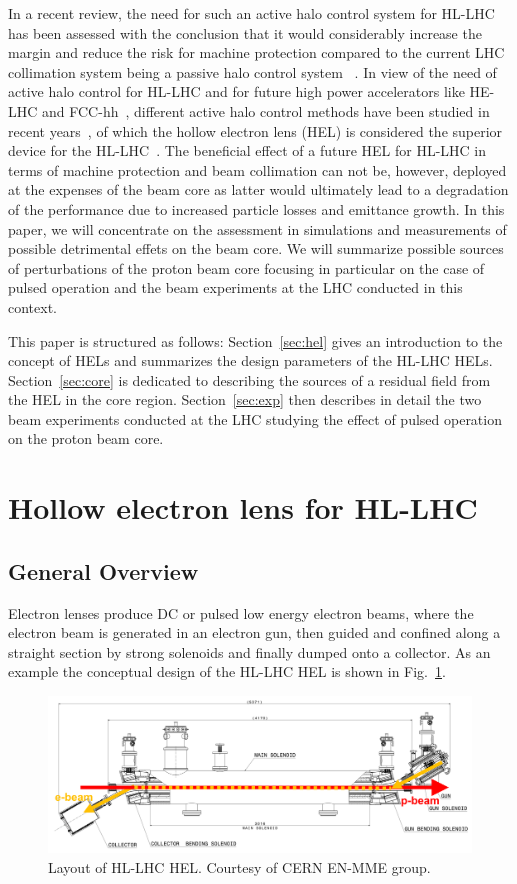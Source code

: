\documentclass[%
 reprint,
 amsmath,amssymb,
 aps,
prstab,
]{revtex4-1}
\begin{document}
In a recent review, the need for such an active halo control system for HL-LHC has been assessed with the conclusion that it would considerably increase the margin and reduce the risk for machine protection compared to the current LHC collimation system being a passive halo control system ~\cite{helreview}. In view of the need of active halo control for HL-LHC and for future high power accelerators like HE-LHC and FCC-hh~\cite{helhcparam2011,fcc_coll_ipac2017}, different active halo control methods have been studied in recent years~\cite{helreview_bruce}, of which the hollow electron lens (HEL) is considered the superior device for the HL-LHC~\cite{helreview}. The beneficial effect of a future HEL for HL-LHC in terms of machine protection and beam collimation can not be, however, deployed at the expenses of the beam core as latter would ultimately lead to a degradation of the performance due to increased particle losses and emittance growth. In this paper, we will concentrate on the assessment in simulations and measurements of possible detrimental effets on the beam core. We will summarize possible sources of perturbations of the proton beam core focusing in particular on the case of pulsed operation and the beam experiments at the LHC conducted in this context.

This paper is structured as follows: Section~\ref{sec:hel} gives an introduction to the concept of HELs and summarizes the design parameters of the HL-LHC HELs. Section~\ref{sec:core} is dedicated to describing the sources of a residual field from the HEL in the core region. Section~\ref{sec:exp} then describes in detail the two beam experiments conducted at the LHC studying the effect of pulsed operation on the proton beam core.

\section{Hollow electron lens for HL-LHC\label{sec:hel}}
\subsection{General Overview\label{sec:hel:intro}}
Electron lenses produce DC or pulsed low energy electron beams, where the electron beam is generated in an electron gun, then guided and confined along a straight section by strong solenoids and finally dumped onto a collector. As an example the conceptual design of the HL-LHC HEL is shown in Fig.~\ref{fig:hel_layout}.
\begin{figure}[h]
	\includegraphics[width=1.0\linewidth]{hel_layout_epbeam}%
	\caption{\label{fig:hel_layout} Layout of HL-LHC HEL. Courtesy of CERN EN-MME group.}
\end{figure}
\end{document}
